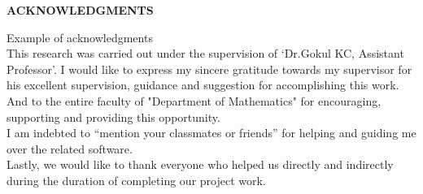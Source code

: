 



\begin{center}
	{\Large{\bf{ACKNOWLEDGMENTS}}}\\
\end{center}

\noindent
Example of acknowledgments\\

\noindent
This research was carried out under the supervision of `Dr.Gokul KC, Assistant Professor'. I would like to express my sincere gratitude towards my supervisor for his excellent supervision, guidance and suggestion for accomplishing this work. And to the entire faculty of "Department of Mathematics" for encouraging, supporting and providing this opportunity.\\

\noindent
I am indebted to ``mention your classmates or friends'' for helping and guiding me over the related software. \\

\noindent
Lastly, we would like to thank everyone who helped us directly and indirectly during the duration of completing our project work.




